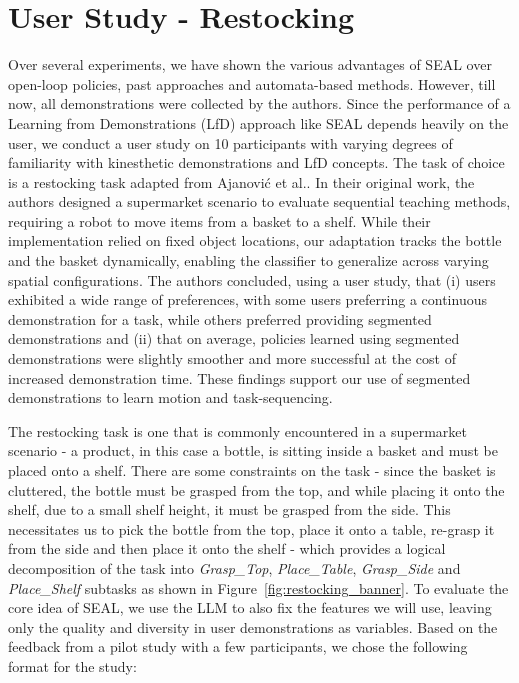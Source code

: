 \documentclass[journal]{IEEEtran}
\begin{document}
\section{User Study - Restocking}
\label{sec:user_study}

Over several experiments, we have shown the various advantages of SEAL over open-loop policies, past approaches and automata-based methods. However, till now, all demonstrations were collected by the authors. Since the performance of a Learning from Demonstrations (LfD) approach like SEAL depends heavily on the user, we conduct a user study on 10 participants with varying degrees of familiarity with kinesthetic demonstrations and LfD concepts. The task of choice is a restocking task adapted from Ajanović et al.\cite{11369949}. In their original work, the authors designed a supermarket scenario to evaluate sequential teaching methods, requiring a robot to move items from a basket to a shelf. While their implementation relied on fixed object locations, our adaptation tracks the bottle and the basket dynamically, enabling the classifier to generalize across varying spatial configurations. The authors concluded, using a user study, that (i) users exhibited a wide range of preferences, with some users preferring a continuous demonstration for a task, while others preferred providing segmented demonstrations and (ii) that on average, policies learned using segmented demonstrations were slightly smoother and more successful at the cost of increased demonstration time.
These findings support our use of segmented demonstrations to learn motion and task-sequencing.

The restocking task is one that is commonly encountered in a supermarket scenario - a product, in this case a bottle, is sitting inside a basket and must be placed onto a shelf. There are some constraints on the task - since the basket is cluttered, the bottle must be grasped from the top, and while placing it onto the shelf, due to a small shelf height, it must be grasped from the side. This necessitates us to pick the bottle from the top, place it onto a table, re-grasp it from the side and then place it onto the shelf - which provides a logical decomposition of the task into \textit{Grasp\_Top}, \textit{Place\_Table}, \textit{Grasp\_Side} and \textit{Place\_Shelf} subtasks as shown in Figure~\ref{fig:restocking_banner}. To evaluate the core idea of SEAL, we use the LLM to also fix the features we will use, leaving only the quality and diversity in user demonstrations as variables. Based on the feedback from a pilot study with a few participants, we chose the following format for the study:
\end{document}
